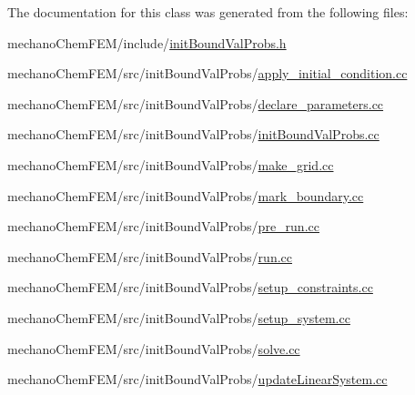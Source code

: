 The documentation for this class was generated from the following files\-:\begin{DoxyCompactItemize}
\item 
mechano\-Chem\-F\-E\-M/include/\hyperlink{init_bound_val_probs_8h}{init\-Bound\-Val\-Probs.\-h}\item 
mechano\-Chem\-F\-E\-M/src/init\-Bound\-Val\-Probs/\hyperlink{apply__initial__condition_8cc}{apply\-\_\-initial\-\_\-condition.\-cc}\item 
mechano\-Chem\-F\-E\-M/src/init\-Bound\-Val\-Probs/\hyperlink{init_bound_val_probs_2declare__parameters_8cc}{declare\-\_\-parameters.\-cc}\item 
mechano\-Chem\-F\-E\-M/src/init\-Bound\-Val\-Probs/\hyperlink{init_bound_val_probs_8cc}{init\-Bound\-Val\-Probs.\-cc}\item 
mechano\-Chem\-F\-E\-M/src/init\-Bound\-Val\-Probs/\hyperlink{make__grid_8cc}{make\-\_\-grid.\-cc}\item 
mechano\-Chem\-F\-E\-M/src/init\-Bound\-Val\-Probs/\hyperlink{mark__boundary_8cc}{mark\-\_\-boundary.\-cc}\item 
mechano\-Chem\-F\-E\-M/src/init\-Bound\-Val\-Probs/\hyperlink{pre__run_8cc}{pre\-\_\-run.\-cc}\item 
mechano\-Chem\-F\-E\-M/src/init\-Bound\-Val\-Probs/\hyperlink{run_8cc}{run.\-cc}\item 
mechano\-Chem\-F\-E\-M/src/init\-Bound\-Val\-Probs/\hyperlink{setup__constraints_8cc}{setup\-\_\-constraints.\-cc}\item 
mechano\-Chem\-F\-E\-M/src/init\-Bound\-Val\-Probs/\hyperlink{setup__system_8cc}{setup\-\_\-system.\-cc}\item 
mechano\-Chem\-F\-E\-M/src/init\-Bound\-Val\-Probs/\hyperlink{solve_8cc}{solve.\-cc}\item 
mechano\-Chem\-F\-E\-M/src/init\-Bound\-Val\-Probs/\hyperlink{update_linear_system_8cc}{update\-Linear\-System.\-cc}\end{DoxyCompactItemize}
